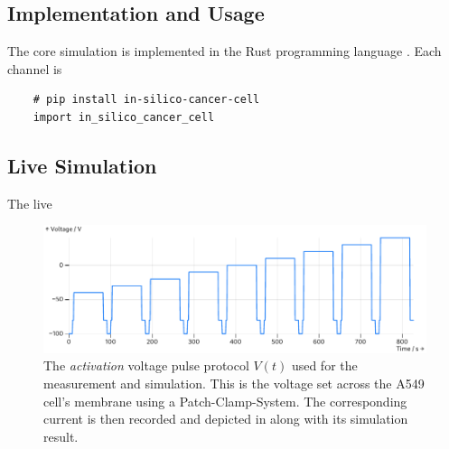 \documentclass[USenglish,twocolumn]{article}
\begin{document}
  \subsection{Implementation and Usage}
  The core simulation is implemented in the Rust programming language \cite{2014-rust}.
  Each channel is

  \begin{verbatim}
    # pip install in-silico-cancer-cell
    import in_silico_cancer_cell
  \end{verbatim}

  \subsection{Live Simulation}
  The live

  \begin{figure}
    \includegraphics[width=\columnwidth]{../figures/results/voltage-protocol.pdf}
    \caption{The \textit{activation} voltage pulse protocol $V(t)$ used for the measurement and simulation. This is the voltage set across the A549 cell's membrane using a Patch-Clamp-System. The corresponding current is then recorded and depicted in  along with its simulation result.}
    \label{figure:voltage-protocol}
  \end{figure}
\end{document}
